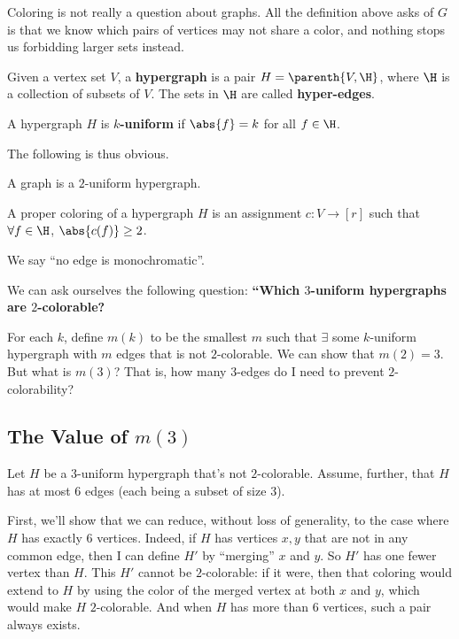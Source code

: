 Coloring is not really a question about graphs. All the definition above asks of $G$ is that we know which pairs of vertices may not share a color, and nothing stops us forbidding larger sets instead.

\begin{boxdefinition}[Hypergraph] \label{Ch2:Def:Hypergraph}
    Given a vertex set $V$, a \textbf{hypergraph} is a pair $H = \parenth{V, \H}$, where $\H$ is a collection of subsets of $V$. The sets in $\H$ are called \textbf{hyper-edges}.
\end{boxdefinition}

\begin{boxdefinition}[Uniformity]
    A hypergraph $H$ is \textbf{$k$-uniform} if $\abs{f} = k$ for all $f \in \H$.
\end{boxdefinition}

The following is thus obvious.

\begin{boxproposition}
    A graph is a $2$-uniform hypergraph.
\end{boxproposition}

\begin{boxdefinition}
A proper coloring of a hypergraph $H$ is an assignment $c : V \to [r]$ such that $\forall f \in \H$, $\abs{c(f)} \geq 2$.
\end{boxdefinition}

We say ``no edge is monochromatic''.

We can ask ourselves the following question: \textbf{``Which $3$-uniform hypergraphs are $2$-colorable?}

For each $k$, define $m(k)$ to be the smallest $m$ such that $\exists$ some $k$-uniform hypergraph with $m$ edges that is not $2$-colorable. We can show that $m(2) = 3$. But what is $m(3)$? That is, how many $3$-edges do I need to prevent $2$-colorability?

\subsection{The Value of $m(3)$}

Let $H$ be a $3$-uniform hypergraph that's not $2$-colorable. Assume, further, that $H$ has at most $6$ edges (each being a subset of size $3$).

First, we'll show that we can reduce, without loss of generality, to the case where $H$ has exactly $6$ vertices. Indeed, if $H$ has vertices $x, y$ that are not in any common edge, then I can define $H'$ by ``merging'' $x$ and $y$. So $H'$ has one fewer vertex than $H$. This $H'$ cannot be $2$-colorable: if it were, then that coloring would extend to $H$ by using the color of the merged vertex at both $x$ and $y$, which would make $H$ $2$-colorable. And when $H$ has more than $6$ vertices, such a pair always exists.

